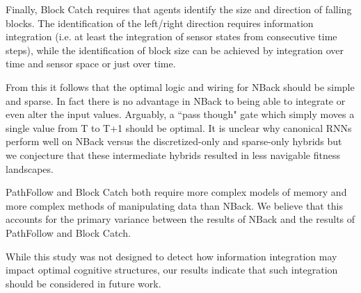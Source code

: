 Finally, Block Catch requires that agents identify the size and direction of falling blocks. 
The identification of the left/right direction requires information integration (i.e. at least the integration of sensor states from consecutive time steps), while the identification of block size can be achieved by integration over time and sensor space or just over time.

From this it follows that the optimal logic and wiring for NBack should be simple and sparse. 
In fact there is no advantage in NBack to being able to integrate or even alter the input values. 
Arguably, a ``pass though" gate which simply moves a single value from T to T+1 should be optimal. 
It is unclear why canonical RNNs perform well on NBack versus the discretized-only and sparse-only hybrids but we conjecture that these intermediate hybrids resulted in less navigable fitness landscapes. 
 
PathFollow and Block Catch both require more complex models of memory and more complex methods of manipulating data than NBack. 
We believe that this accounts for the primary variance between the results of NBack and the results of PathFollow and Block Catch.

While this study was not designed to detect how information integration may impact optimal cognitive structures, our results indicate that such integration should be considered in future work.
